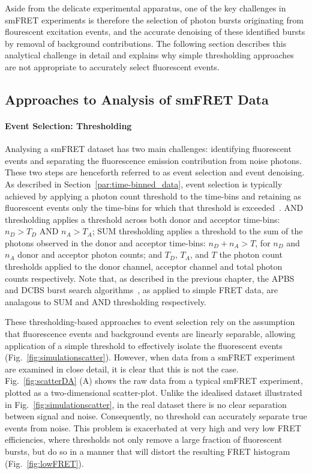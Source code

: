 Aside from the delicate experimental apparatus, one of the key challenges in smFRET experiments is therefore the selection of photon bursts originating from flourescent excitation events, and the accurate denoising of these identified bursts by removal of background contributions. The following section describes this analytical challenge in detail and explains why simple thresholding approaches are not appropriate to accurately select fluorescent events.

\subsection{Approaches to Analysis of smFRET Data}
\paragraph{Event Selection: Thresholding}
Analysing a smFRET dataset has two main challenges: identifying fluorescent events and separating the fluorescence emission contribution from noise photons. These two steps are henceforth referred to as event selection and event denoising. As described in Section~\ref{par:time-binned_data}, event selection is typically achieved by applying a photon count threshold to the time-bins and retaining as fluorescent events only the time-bins for which that threshold is exceeded~\cite{deniz01, gell06, ying00}. AND thresholding applies a threshold across both donor and acceptor time-bins: $n_D > T_D$ AND $n_A > T_A$; SUM thresholding applies a threshold to the sum of the photons observed in the donor and acceptor time-bins: $n_D  + n_A > T$, for $n_D$ and  $n_A$ donor and acceptor photon counts; and $T_D$, $T_A$, and $T$ the photon count thresholds applied to the donor channel, acceptor channel and total photon counts respectively. Note that, as described in the previous chapter, the APBS and DCBS burst search algorithms~\cite{nir06}, as applied to simple FRET data, are analagous to SUM and AND thresholding respectively.

These thresholding-based approaches to event selection rely on the assumption that fluorescence events and background events are linearly separable, allowing application of a simple threshold to effectively isolate the fluorescent events (Fig.~\ref{fig:simulationscatter}). However, when data from a smFRET experiment are examined in close detail, it is clear that this is not the case. Fig.~\ref{fig:scatterDA} (A) shows the raw data from a typical smFRET experiment, plotted as a two-dimensional scatter-plot. Unlike the idealised dataset illustrated in Fig.~\ref{fig:simulationscatter}, in the real dataset there is no clear separation between signal and noise. Consequently, no threshold can accurately separate true events from noise. This problem is exacerbated at very high and very low FRET efficiencies, where thresholds not only remove a large fraction of fluorescent bursts, but do so in a manner that will distort the resulting FRET histogram (Fig.~\ref{fig:lowFRET}).

